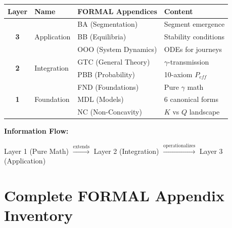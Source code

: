 \begin{tcolorbox}[colback=blue!3!white, colframe=blue!60!black,
    title=\textbf{Three-Layer Architecture}]

\begin{center}
\begin{tabular}{|c|l|l|l|}
\hline
\textbf{Layer} & \textbf{Name} & \textbf{FORMAL Appendices} & \textbf{Content} \\
\hline
\hline
\multirow{3}{*}{\textbf{3}} & \multirow{3}{*}{Application} & BA (Segmentation) & Segment emergence \\
& & BB (Equilibria) & Stability conditions \\
& & OOO (System Dynamics) & ODEs for journeys \\
\hline
\multirow{2}{*}{\textbf{2}} & \multirow{2}{*}{Integration} & GTC (General Theory) & $\gamma$-transmission \\
& & PBB (Probability) & 10-axiom $P_{eff}$ \\
\hline
\multirow{3}{*}{\textbf{1}} & \multirow{3}{*}{Foundation} & FND (Foundations) & Pure $\gamma$ math \\
& & MDL (Models) & 6 canonical forms \\
& & NC (Non-Concavity) & $K$ vs $Q$ landscape \\
\hline
\end{tabular}
\end{center}

\vspace{0.5em}

\textbf{Information Flow:}
\begin{center}
Layer 1 (Pure Math) $\xrightarrow{\text{extends}}$ Layer 2 (Integration) $\xrightarrow{\text{operationalizes}}$ Layer 3 (Application)
\end{center}

\end{tcolorbox}

\section{Complete FORMAL Appendix Inventory}
\label{sec:fm-inventory}

